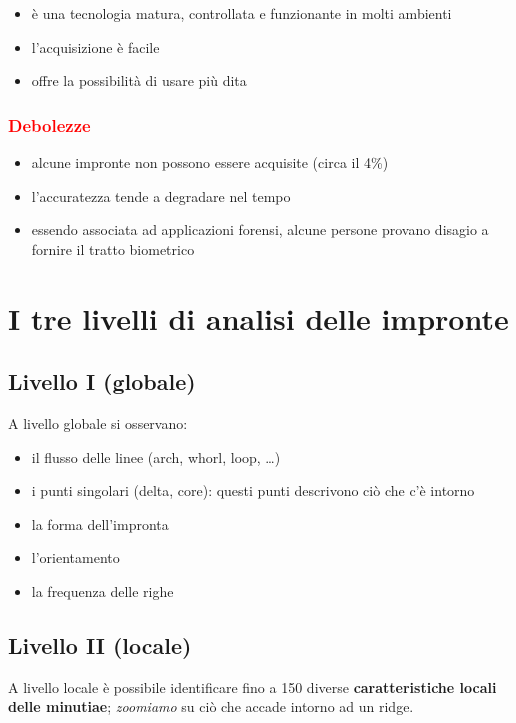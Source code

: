 \documentclass{report}
\begin{document}
\begin{itemize}
    \item è una tecnologia matura, controllata e funzionante in molti ambienti
    \item l'acquisizione è facile
    \item offre la possibilità di usare più  dita
\end{itemize}

\subsubsection{\textcolor{red}{Debolezze}}

\begin{itemize}
    \item alcune impronte non possono essere acquisite (circa il 4\%)
    \item l'accuratezza tende a degradare nel tempo
    \item essendo associata ad applicazioni forensi, alcune persone provano disagio a fornire il tratto biometrico
\end{itemize}

\newpage
\section{I tre livelli di analisi delle impronte}

\subsection{Livello I (globale)}
A livello globale si osservano:
\begin{itemize}
    \item il flusso delle linee (arch, whorl, loop, \dots)
    \item i punti singolari (delta, core): questi punti descrivono ciò che c'è intorno
    \item la forma dell'impronta
    \item l'orientamento
    \item la frequenza delle righe 
\end{itemize}

\subsection{Livello II (locale)}

A livello locale è possibile identificare fino a 150 diverse \textbf{caratteristiche locali
delle minutiae}; \textit{zoomiamo} su ciò che accade intorno ad un ridge.
\end{document}

